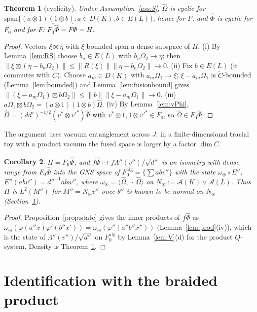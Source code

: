 \documentclass[11pt]{article}
\newtheorem{theorem}{Theorem}[section]
\newtheorem{corollary}[theorem]{Corollary}
\theoremstyle{definition}
\theoremstyle{remark}
\newcommand{\cA}{\mathcal A}
\newcommand{\Om}{\Omega}
\newcommand{\Lam}{\Lambda}
\newcommand{\ph}{\varphi}
\newcommand{\fus}{\boxtimes}
\newcommand{\ip}[2]{\langle #1,#2\rangle}
\begin{document}
\begin{theorem}[cyclicity]\label{thm:cyclic}
Under Assumption~\ref{ass:S}, $\hat\Om$ is cyclic for $\mathrm{span}\{(a\otimes1)(1\otimes b):a\in D(K),b\in E(L)\}$, hence for $F$, and $\hat\Phi$ is cyclic for $F_0$ and for $F$: $\overline{F_0\hat\Phi}=\overline{F\hat\Phi}=H$.
\end{theorem}
\begin{proof}
Vectors $\xi\fus\eta$ with $\xi$ bounded span a dense subspace of $H$. (i) By Lemma~\ref{lem:RS} choose $b_n\in E(L)$ with $b_n\Om_2\to\eta$; then $\|\xi\fus(\eta-b_n\Om_2)\|\le\|R(\xi)\|\|\eta-b_n\Om_2\|\to0$. (ii) Fix $b\in E(L)$ (it commutes with $C$). Choose $a_m\in D(K)$ with $a_m\Om_1\to\xi$; $\xi-a_m\Om_1$ is $\tilde C$-bounded (Lemma~\ref{lem:bounded}) and Lemma~\ref{lem:fusionbound} gives $\|(\xi-a_m\Om_1)\fus b\Om_2\|\le\|b\|\|\xi-a_m\Om_1\|\to0$. (iii) $a\Om_1\fus b\Om_2=(a\otimes1)(1\otimes b)\hat\Om$. (iv) By Lemma~\ref{lem:vPhi}, $\hat\Om=(dd')^{-1/2}(v^*\otimes v'^*)\hat\Phi$ with $v^*\otimes1,1\otimes v'^*\in F_0$, so $\hat\Om\in F_0\hat\Phi$.
\end{proof}
The argument uses vacuum entanglement across $J$: in a finite-dimensional tracial toy with a product vacuum the fused space is larger by a factor $\dim C$.

\begin{corollary}\label{cor:L2}
$H=\overline{F_0\hat\Phi}$, and $f\hat\Phi\mapsto f\Lam''(v'')/\sqrt{d''}$ is an isometry with dense range from $F_0\hat\Phi$ into the GNS space of $F_0^{\mathrm{alg}}=\{\sum abv''\}$ with the state $\omega_\circledast\circ E''$, $E''(abv'')=d''^{-1}abw''$, where $\omega_\circledast=\ip{\hat\Om}{\,\cdot\,\hat\Om}$ on $N_\circledast:=\cA(K)\vee\cA(L)$. Thus $H$ is $L^2(M'')$ for $M''=N_\circledast v''$ once $\theta''$ is known to be normal on $N_\circledast$ (Section~\ref{sec:net}).
\end{corollary}
\begin{proof}
Proposition~\ref{prop:state} gives the inner products of $f\hat\Phi$ as $\omega_\circledast(\ph(a''x)\ph'(b''x'))=\omega_\circledast(\ph''(a''b''x''))$ (Lemma~\ref{lem:prod}(iv)), which is the state of $\Lam''(v'')/\sqrt{d''}$ on $F_0^{\mathrm{alg}}$ by Lemma~\ref{lem:V}(d) for the product $Q$-system. Density is Theorem~\ref{thm:cyclic}.
\end{proof}

\section{Identification with the braided product}\label{sec:net}
\end{document}
